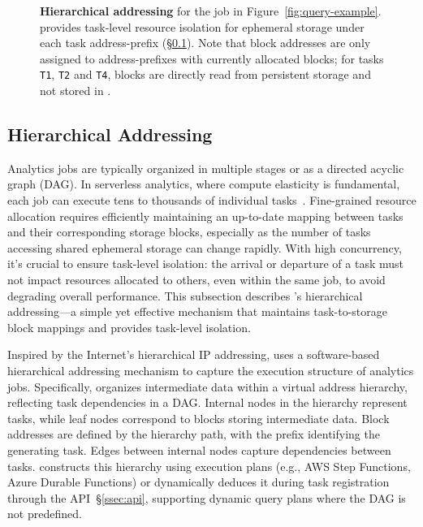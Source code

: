 \begin{figure}[t]
\begin{tikzpicture}[font=\scriptsize, yscale=0.75, task/.style={draw, circle, align=center, inner sep=2pt}, block/.style={draw, align=center, fill=gray!20, inner sep=2pt}]
  \end{tikzpicture}
  \caption[Hierarchical addressing]{\textbf{Hierarchical addressing} for the job in Figure~\ref{fig:query-example}. \jiffy provides task-level resource isolation for ephemeral storage under each task address-prefix (\S\ref{ssec:hva}). Note that block addresses are only assigned to address-prefixes with currently allocated blocks; for tasks \texttt{T1}, \texttt{T2} and \texttt{T4}, blocks are directly read from persistent storage and not stored in \jiffy.}
  \label{fig:hina}
\end{figure}

\subsection{Hierarchical Addressing}
\label{ssec:hva}
Analytics jobs are typically organized in multiple stages or as a directed acyclic graph (DAG). In serverless analytics, where compute elasticity is fundamental, each job can execute tens to thousands of individual tasks~\cite{starling, locus, pocket, flint, sparkonlambda, cirrus, excamera, pywren, numpywren, gg, athena, aurora, azuresqldw, cloudburst, snowset}. Fine-grained resource allocation requires efficiently maintaining an up-to-date mapping between tasks and their corresponding storage blocks, especially as the number of tasks accessing shared ephemeral storage can change rapidly. With high concurrency, it's crucial to ensure task-level isolation: the arrival or departure of a task must not impact resources allocated to others, even within the same job, to avoid degrading overall performance. This subsection describes \jiffy's hierarchical addressing—a simple yet effective mechanism that maintains task-to-storage block mappings and provides task-level isolation.

Inspired by the Internet's hierarchical IP addressing, \jiffy uses a software-based hierarchical addressing mechanism to capture the execution structure of analytics jobs. Specifically, \jiffy organizes intermediate data within a virtual address hierarchy, reflecting task dependencies in a DAG. Internal nodes in the hierarchy represent tasks, while leaf nodes correspond to \jiffy blocks storing intermediate data. Block addresses are defined by the hierarchy path, with the prefix identifying the generating task. Edges between internal nodes capture dependencies between tasks. \jiffy constructs this hierarchy using execution plans (e.g., AWS Step Functions, Azure Durable Functions) or dynamically deduces it during task registration through the \jiffy API~\S\ref{ssec:api}, supporting dynamic query plans where the DAG is not predefined.

